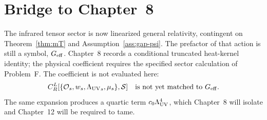 \section{Bridge to Chapter~8}
\label{sec:ch8-bridge-from-7}

The infrared tensor sector is now linearized general relativity,
contingent on Theorem~\ref{thm:mT} and Assumption~\ref{ass:gap-psi}.
The prefactor of that action is still a symbol, \(G_{\mathrm{eff}}\). Chapter~8
records a conditional truncated heat-kernel identity; the physical
coefficient requires the specified sector calculation of Problem~F.
The coefficient is not evaluated here:
\begin{equation}
  \label{eq:Geff-next}
  C_R^L[\{\mathcal O_s,w_s,{\Lambda_{\mathrm{UV}}}_s,\mu_s\},\mathcal S]
  \quad\text{is not yet matched to }G_{\mathrm{eff}}.
\end{equation}
The same expansion produces a quartic term \(c_0\Lambda_{\mathrm{UV}}^4\), which
Chapter~8 will isolate and Chapter~12 will be required to tame.